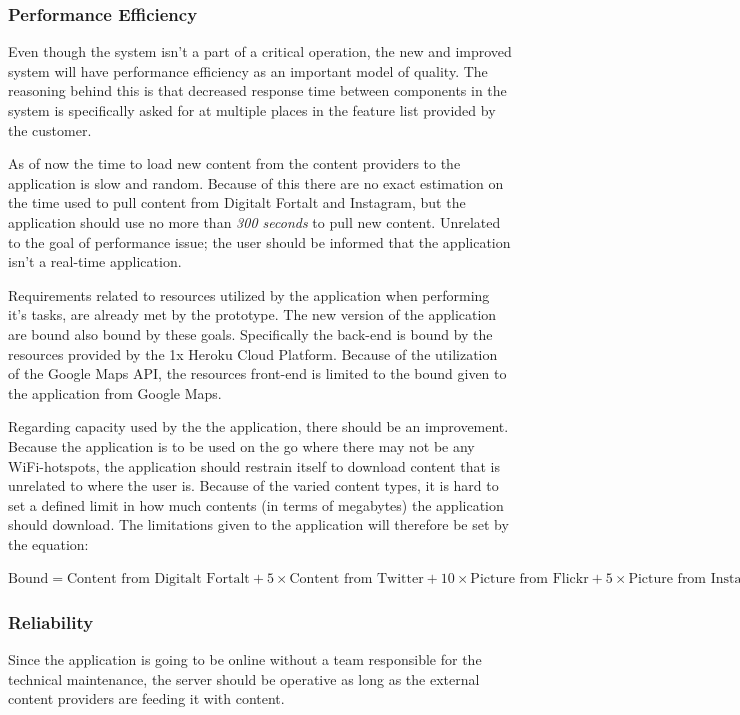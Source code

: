 \subsubsection{Performance Efficiency}
Even though the system isn't a part of a critical operation, the new and improved system will have performance efficiency as an important model of quality. The reasoning behind this is that decreased response time between components in the system is specifically asked for at multiple places in the feature list provided by the customer. 

As of now the time to load new content from the content providers to the application is slow and random. Because of this there are no exact estimation on the time used to pull content from Digitalt Fortalt and Instagram, but the application should use no more than \textit{300 seconds} to pull new content. Unrelated to the goal of performance issue; the user should be informed that the application isn't a real-time application.

Requirements related to resources utilized by the application when performing it's tasks, are already met by the prototype. The new version of the application are bound also bound by these goals. Specifically the back-end is bound by the resources provided by the 1x Heroku Cloud Platform. Because of the utilization of the Google Maps API, the resources front-end is limited to the bound given to the application from Google Maps. 

Regarding capacity used by the the application, there should be an improvement. Because the application is to be used on the go where there may not be any WiFi-hotspots, the application should restrain itself to download content that is unrelated to where the user is. Because of the varied content types, it is hard to set a defined limit in how much contents (in terms of megabytes) the application should download. The limitations given to the application will therefore be set by the equation: \\ 
\begin{center} 
$\textrm{Bound}=\textrm{Content from Digitalt Fortalt}+5\times\textrm{Content from Twitter}+10\times\textrm{Picture from Flickr}+5\times\textrm{Picture from Instagram}$
\end{center}

\subsubsection{Reliability}
Since the application is going to be online without a team responsible for the technical maintenance, the server should be operative as long as the external content providers are feeding it with content. 


